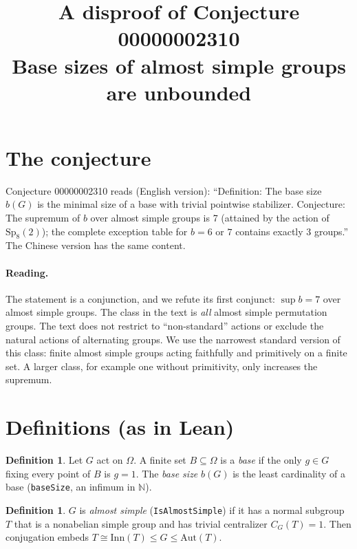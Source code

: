 \documentclass[11pt]{article}
\title{A disproof of Conjecture 00000002310\\[2pt]
\large Base sizes of almost simple groups are unbounded}
\date{}
\theoremstyle{definition}
\newtheorem{definition}[theorem]{Definition}
\theoremstyle{remark}
\renewcommand{\_}{\oldus\allowbreak}
\begin{document}
\sloppy
\maketitle

\section{The conjecture}

Conjecture 00000002310 reads (English version): ``Definition: The base size $b(G)$ is the minimal
size of a base with trivial pointwise stabilizer. Conjecture: The supremum of $b$ over almost
simple groups is 7 (attained by the action of $\mathrm{Sp}_8(2)$); the complete exception table
for $b=6$ or $7$ contains exactly 3 groups.'' The Chinese version has the same content.

\paragraph{Reading.} The statement is a conjunction, and we refute its first conjunct:
$\sup b = 7$ over almost simple groups. The class in the text is \emph{all} almost simple
permutation groups. The text does not restrict to ``non-standard'' actions or exclude the
natural actions of alternating groups. We use the narrowest standard version of this class:
finite almost simple groups acting faithfully and primitively on a finite set. A larger class,
for example one without primitivity, only increases the supremum.

\section{Definitions (as in Lean)}

\begin{definition}
Let $G$ act on $\Omega$. A finite set $B\subseteq\Omega$ is a \emph{base} if the only $g\in G$
fixing every point of $B$ is $g=1$. The \emph{base size} $b(G)$ is the least cardinality of a base
(\texttt{baseSize}, an infimum in $\mathbb N$).
\end{definition}

\begin{definition}
$G$ is \emph{almost simple} (\texttt{IsAlmostSimple}) if it has a normal subgroup $T$ that is a
nonabelian simple group and has trivial centralizer $C_G(T)=1$. Then conjugation embeds
$T\cong\mathrm{Inn}(T)\le G\le\mathrm{Aut}(T)$.
\end{definition}
\end{document}
